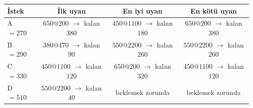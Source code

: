 \begin{tabular}{@{}lccc@{}}
\toprule
\textbf{İstek} & \textbf{İlk uyan} & \textbf{En iyi uyan} & \textbf{En kötü uyan}\\
\midrule
A $= 270$ & $650@200$ $\to$ kalan $380$ & $450@1100$ $\to$ kalan $180$ & $650@200$ $\to$ kalan $380$\\
B $= 290$ & $380@470$ $\to$ kalan $90$ & $550@2200$ $\to$ kalan $260$ & $550@2200$ $\to$ kalan $260$\\
C $= 330$ & $450@1100$ $\to$ kalan $120$ & $650@200$ $\to$ kalan $320$ & $450@1100$ $\to$ kalan $120$\\
D $= 510$ & $550@2200$ $\to$ kalan $40$ & \textcolor{red!60!black}{beklemek zorunda} & \textcolor{red!60!black}{beklemek zorunda}\\
\bottomrule
\end{tabular}
